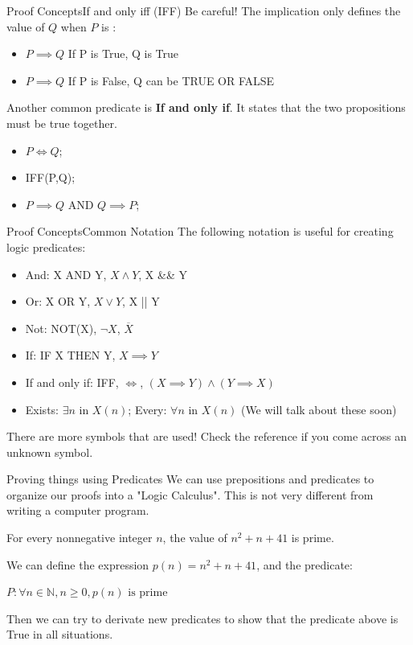 \begin{frame}[t]{Proof Concepts}{If and only iff (IFF)}
  \alert{Be careful!} The implication only defines the value of $Q$ when $P$ is :

  \begin{itemize}
  \item $P \implies Q$ \hspace{2cm} If P is True, Q is True\\
  \item $P \implies Q$ \hspace{2cm} \alert{If P is False, Q can be TRUE OR FALSE}
  \end{itemize}
  \bigskip

  Another common predicate is {\bf If and only if}. It states that the two propositions must be true together.
  \begin{itemize}
    \item $P \iff Q$;
    \item IFF(P,Q);
    \item $P\implies Q$ AND $Q \implies P$;
  \end{itemize}
\end{frame}

\begin{frame}[t]{Proof Concepts}{Common Notation}
  The following notation is useful for creating logic predicates:\bigskip

  \begin{itemize}
  \item And: X AND Y, $X \land Y$, X \&\& Y
  \item Or: X OR Y, $X \lor Y$, X || Y
  \item Not: NOT(X), $\lnot X$, $\overline{X}$
  \item If: IF X THEN Y, $X \implies Y$
  \item If and only if: IFF, $\iff$, $(X \implies Y) \land (Y \implies X)$
  \item Exists: $\exists n \text{ in } X(n)$; Every: $\forall n \text{ in } X(n)$ (\alert{We will talk about these soon})
  \end{itemize}\bigskip

  There are more symbols that are used! Check the reference if you come across an unknown symbol.
\end{frame}

\begin{frame}[t]{Proving things using Predicates}{}
  We can use prepositions and predicates to organize our proofs into a "Logic Calculus". This is not very different from writing a computer program.
  
    \begin{block}{}
    For every nonnegative integer $n$, the value of $n^2+n+41$ is prime.
  \end{block}\medskip

  We can define the expression $p(n) = n^2+n+41$, and the predicate:

  $P: \forall n \in \mathbb{N}, n \ge 0, p(n) \text{ is prime}$\bigskip

  Then we can try to derivate new predicates to show that the predicate above is True in all situations.
\end{frame}


